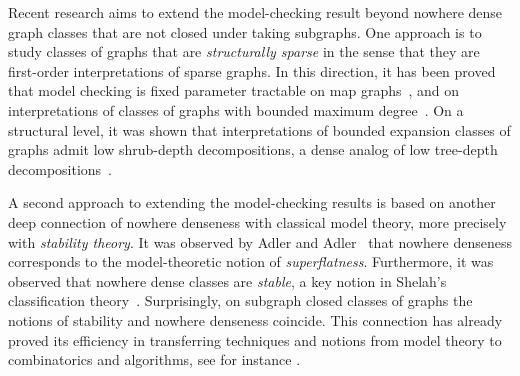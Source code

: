 Recent research aims to extend the model-checking result
beyond nowhere dense graph classes that are not closed 
under taking subgraphs. One approach is to study classes
of graphs that are \emph{structurally sparse} in the sense
that they are first-order interpretations of sparse graphs. 
In this direction, it has been proved that model checking is 
fixed parameter tractable on map graphs~\cite{eickmeyer2017fo}, 
and on interpretations of classes of graphs with bounded 
maximum degree~\cite{gajarsky2016new}. On a structural 
level, it was shown that interpretations of bounded expansion 
classes of graphs admit low shrub-depth decompositions, 
a dense analog of low tree-depth 
decompositions~\cite{gajarsky2018first}.

A second approach to extending the model-checking results 
is based on another deep connection of
nowhere denseness with classical model theory, more precisely
with \emph{stability theory}. It was observed by Adler and 
Adler~\cite{adler2014interpreting} that nowhere denseness
corresponds to the model-theoretic notion of 
\emph{superflatness}. Furthermore, it was observed that nowhere
dense classes are \emph{stable}, a key notion in Shelah's 
classification theory~\cite{shelah1990classification}. 
Surprisingly, on subgraph closed classes of graphs the notions
of stability and nowhere denseness coincide. This connection
has already proved its efficiency in transferring techniques and 
notions from model theory to combinatorics and algorithms, 
see for instance \cite{siebertz2016polynomial, 
malliaris2014regularity, pilipczuk2018number}. 

